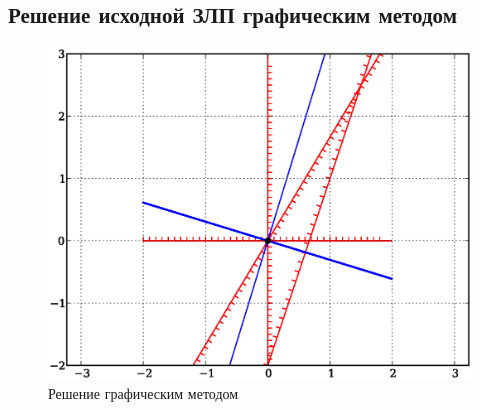 \subsection{Решение исходной ЗЛП графическим методом}
\begin{figure}[ht]
\centering
\includegraphics[width=\textwidth]{img/21}
\caption{Решение графическим методом}\label{21}
\end{figure}